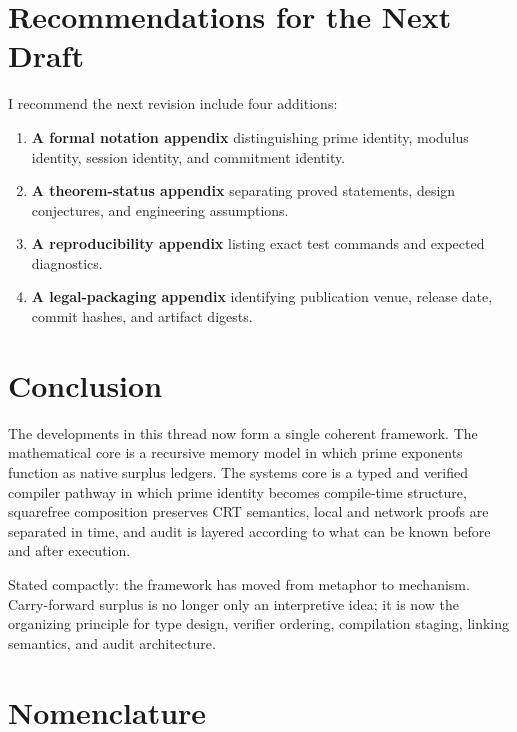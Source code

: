 \documentclass[11pt]{article}
\begin{document}
\section{Recommendations for the Next Draft}

I recommend the next revision include four additions:

\begin{enumerate}[leftmargin=2em]
  \item \textbf{A formal notation appendix} distinguishing prime identity, modulus identity, session identity, and commitment identity.
  \item \textbf{A theorem-status appendix} separating proved statements, design conjectures, and engineering assumptions.
  \item \textbf{A reproducibility appendix} listing exact test commands and expected diagnostics.
  \item \textbf{A legal-packaging appendix} identifying publication venue, release date, commit hashes, and artifact digests.
\end{enumerate}

\section{Conclusion}

The developments in this thread now form a single coherent framework. The mathematical core is a recursive memory model in which prime exponents function as native surplus ledgers. The systems core is a typed and verified compiler pathway in which prime identity becomes compile-time structure, squarefree composition preserves CRT semantics, local and network proofs are separated in time, and audit is layered according to what can be known before and after execution.

Stated compactly: the framework has moved from metaphor to mechanism. Carry-forward surplus is no longer only an interpretive idea; it is now the organizing principle for type design, verifier ordering, compilation staging, linking semantics, and audit architecture.

\appendix

\section{Nomenclature}
\end{document}
